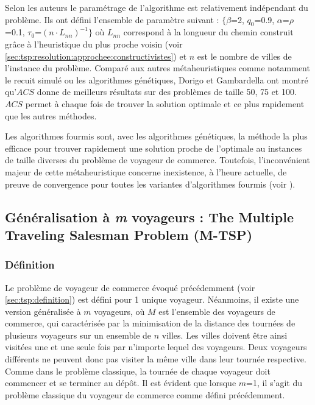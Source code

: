  Selon les auteurs le paramétrage de l'algorithme est relativement indépendant du problème. Ils ont défini l'ensemble de paramètre suivant : $\{\beta$=2, $q_0$=0.9, $\alpha$=$\rho$=0.1, $\tau_0$=$(n\cdot L_{nn})^{-1}\}$ où $L_{nn}$ correspond à la longueur du chemin construit grâce à l'heuristique du plus proche voisin (voir \ref{sec:tsp:resolution:approchee:constructivistes}) et $n$ est le nombre de villes de l'instance du problème.
 Comparé aux autres métaheuristiques comme notamment le recuit simulé ou les algorithmes génétiques, Dorigo et Gambardella ont montré qu'$ACS$ donne de meilleurs résultats sur des problèmes de taille 50, 75 et 100. $ACS$ permet à chaque fois de trouver la solution optimale et ce plus rapidement que les autres méthodes.
 
Les algorithmes fourmis sont, avec les algorithmes génétiques, la méthode la plus efficace pour trouver rapidement une solution proche de l'optimale au instances de taille diverses du problème de voyageur de commerce. Toutefois, l'inconvénient majeur de cette métaheuristique concerne inexistence, à l'heure actuelle, de preuve de convergence pour toutes les variantes d'algorithmes fourmis (voir \cite{Gutjahr2000,Dorigo2005}).


\subsection{Généralisation à \textit{m} voyageurs : The Multiple Traveling Salesman Problem (M-TSP)}

\subsubsection{Définition}
Le problème de voyageur de commerce évoqué précédemment (voir \ref{sec:tsp:definition}) est défini pour 1 unique voyageur. Néanmoins, il existe une version généralisée à $m$ voyageurs, où $M$ est l'ensemble des voyageurs de commerce, qui caractérisée par la minimisation de la distance des tournées de plusieurs voyageurs sur un ensemble de $n$ villes. Les villes doivent être ainsi visitées une et une seule fois par n'importe lequel des voyageurs. Deux voyageurs différents ne peuvent donc pas visiter la même ville dans leur tournée respective. Comme dans le problème classique, la tournée de chaque voyageur doit commencer et se terminer au dépôt. 
Il est évident que lorsque $m$=1, il s'agit du problème classique du voyageur de commerce comme défini précédemment.

